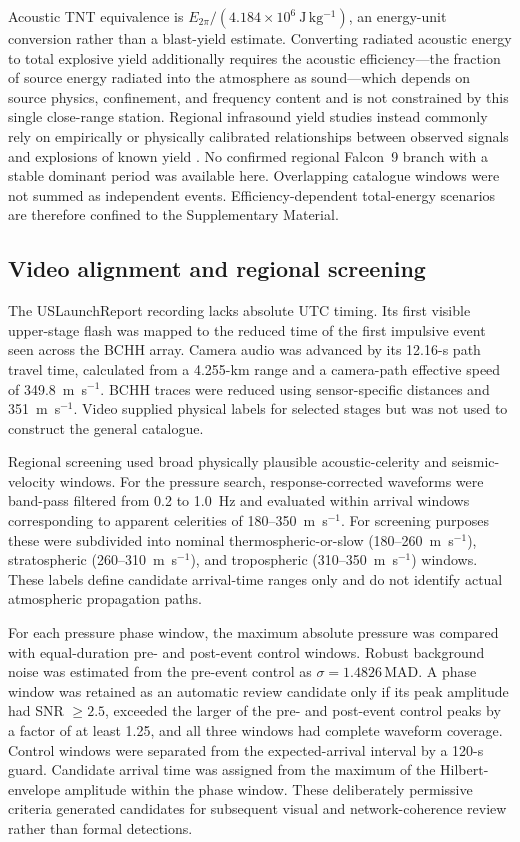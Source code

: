 \documentclass[]{seismica}
\begin{document}
Acoustic TNT equivalence is
$E_{2\pi}/(4.184\times10^6~\mathrm{J\,kg^{-1}})$,
an energy-unit conversion rather than a blast-yield estimate.
Converting radiated acoustic energy to total explosive yield additionally
requires the acoustic efficiency---the fraction of source energy radiated into
the atmosphere as sound---which depends on source physics, confinement, and
frequency content and is not constrained by this single close-range station.
Regional infrasound yield studies instead commonly rely on empirically or
physically calibrated relationships between observed signals and explosions of
known yield
\citep[e.g.,][]{ottemoller_2008,ceranna_2009,pilger_beirut_2021,kim_pasyanos_2022,
silber_scamfer_newglenn_2026}.
No confirmed regional Falcon~9 branch with a stable dominant period was
available here. Overlapping catalogue windows were not summed as independent
events. Efficiency-dependent total-energy scenarios are therefore confined to
the Supplementary Material.

\subsection{Video alignment and regional screening}

The USLaunchReport recording lacks absolute UTC timing. Its first visible upper-stage
flash was mapped to the reduced time of the first impulsive event seen across the BCHH array. Camera audio
was advanced by its 12.16-s path travel time, calculated from a 4.255-km range
and a camera-path effective speed of 349.8~m~s$^{-1}$. BCHH traces were reduced
using sensor-specific distances and 351~m~s$^{-1}$. Video supplied physical
labels for selected stages but was not used to construct the general catalogue.

Regional screening used broad physically plausible acoustic-celerity and
seismic-velocity windows. For the pressure search, response-corrected
waveforms were band-pass filtered from 0.2 to 1.0~Hz and evaluated within
arrival windows corresponding to apparent celerities of
180--350~m~s$^{-1}$. For screening purposes these were subdivided into
nominal thermospheric-or-slow (180--260~m~s$^{-1}$), stratospheric
(260--310~m~s$^{-1}$), and tropospheric (310--350~m~s$^{-1}$) windows.
These labels define candidate arrival-time ranges only and do not identify
actual atmospheric propagation paths.

For each pressure phase window, the maximum absolute pressure was compared
with equal-duration pre- and post-event control windows. Robust background
noise was estimated from the pre-event control as
$\sigma=1.4826\,\mathrm{MAD}$. A phase window was retained as an automatic
review candidate only if its peak amplitude had SNR $\geq2.5$, exceeded the
larger of the pre- and post-event control peaks by a factor of at least 1.25,
and all three windows had complete waveform coverage. Control windows were
separated from the expected-arrival interval by a 120-s guard. Candidate
arrival time was assigned from the maximum of the Hilbert-envelope amplitude
within the phase window. These deliberately permissive criteria generated
candidates for subsequent visual and network-coherence review rather than
formal detections.
\end{document}
